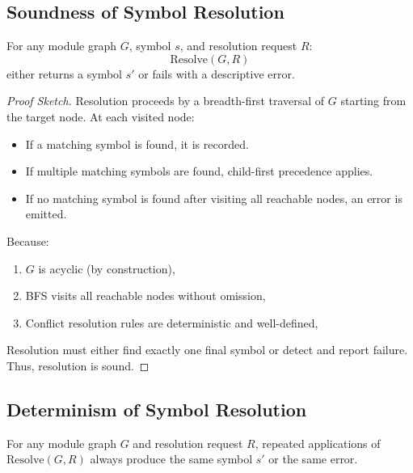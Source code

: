 \documentclass[sigplan,screen]{acmart}
\begin{document}
\subsection{Soundness of Symbol Resolution}
\label{sec:soundness}
\begin{theorem}[Soundness]
For any module graph $G$, symbol $s$, and resolution request $R$:
\[
\text{Resolve}(G, R) 
\]
either returns a symbol $s'$ or fails with a descriptive error.
\end{theorem}
    
\begin{proof}[Proof Sketch]
Resolution proceeds by a breadth-first traversal of $G$ starting from the target node. 
At each visited node:
\begin{itemize}
    \item If a matching symbol is found, it is recorded.
    \item If multiple matching symbols are found, child-first precedence applies.
    \item If no matching symbol is found after visiting all reachable nodes, an error is emitted.
\end{itemize}
Because:
\begin{enumerate}
    \item $G$ is acyclic (by construction),
    \item BFS visits all reachable nodes without omission,
    \item Conflict resolution rules are deterministic and well-defined,
\end{enumerate}
Resolution must either find exactly one final symbol or detect and report failure.
Thus, resolution is sound.
\end{proof}

\subsection{Determinism of Symbol Resolution}
\label{sec:determinism}
\begin{theorem}[Determinism]
For any module graph $G$ and resolution request $R$, repeated applications of $\text{Resolve}(G, R)$ always produce the same symbol $s'$ or the same error.
\end{theorem}
\end{document}
